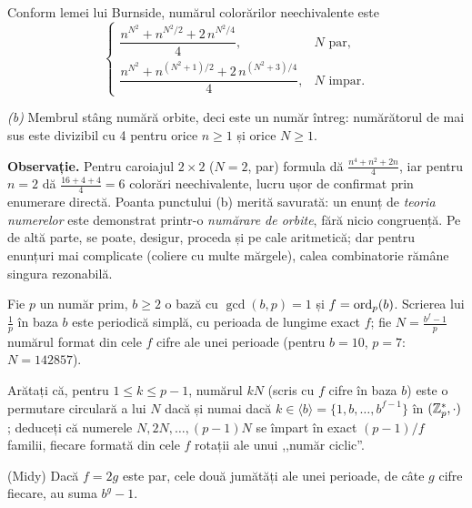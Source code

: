 \begin{solutie}
Conform lemei lui Burnside, numărul colorărilor neechivalente este
\[
\begin{cases}
\dfrac{n^{N^2} + n^{N^2/2} + 2\,n^{N^2/4}}{4}, & N \text{ par},\\[3ex]
\dfrac{n^{N^2} + n^{(N^2+1)/2} + 2\,n^{(N^2+3)/4}}{4}, & N \text{ impar}.
\end{cases}
\]

\emph{(b)} Membrul stâng numără orbite, deci este un număr întreg: numărătorul de mai sus este divizibil cu 4 pentru orice $n \ge 1$ și orice $N \ge 1$.

\medskip
\noindent\textbf{Observație.} Pentru caroiajul $2 \times 2$ ($N = 2$, par) formula dă $\frac{n^4+n^2+2n}{4}$, iar pentru $n = 2$ dă $\frac{16+4+4}{4} = 6$ colorări neechivalente, lucru ușor de confirmat prin enumerare directă. Poanta punctului (b) merită savurată: un enunț de \emph{teoria numerelor} este demonstrat printr-o \emph{numărare de orbite}, fără nicio congruență. Pe de altă parte, se poate, desigur, proceda și pe cale aritmetică; dar pentru enunțuri mai complicate (coliere cu multe mărgele), calea combinatorie rămâne singura rezonabilă.
\end{solutie}

\begin{problema}
Fie $p$ un număr prim, $b \ge 2$ o bază cu $\gcd(b,p) = 1$ și $f = \operatorname{ord}_p(b)$.
Scrierea lui $\frac{1}{p}$ în baza $b$ este periodică simplă, cu perioada de lungime
exact $f$; fie $N = \frac{b^f-1}{p}$ numărul format din cele $f$ cifre ale unei
perioade (pentru $b = 10$, $p = 7$: $N = 142857$).
\begin{parti}
  \item Arătați că, pentru $1 \le k \le p-1$, numărul $kN$ (scris cu $f$ cifre
    în baza $b$) este o permutare circulară a lui $N$ dacă și numai dacă
    $k \in \langle b \rangle = \{1, b, \dots, b^{f-1}\}$ în $(\mathbb{Z}_p^*, \cdot)$;
    deduceți că numerele $N, 2N, \dots, (p-1)N$ se împart în exact $(p-1)/f$
    familii, fiecare formată din cele $f$ rotații ale unui ,,număr ciclic''.
  \item (Midy) Dacă $f = 2g$ este par, cele două jumătăți ale unei perioade, de
    câte $g$ cifre fiecare, au suma $b^g - 1$.
\end{parti}
\end{problema}

